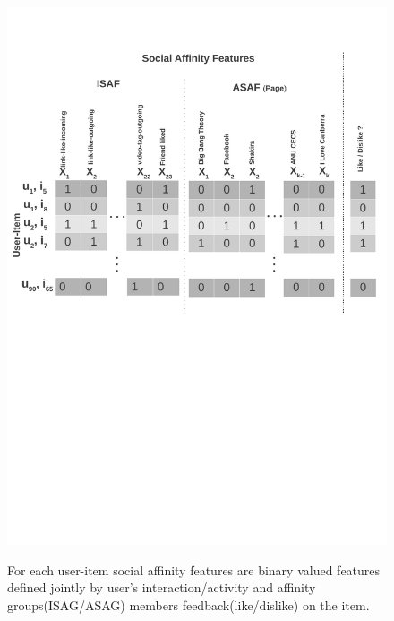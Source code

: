 \begin{figure}[t!]
\centering
\includegraphics[width=1\linewidth]{data/plots/features/saf_features}
\label{fig:Features}
\caption{For each user-item social affinity features are binary valued features defined 
jointly by user's interaction/activity and affinity groups(ISAG/ASAG) members feedback(like/dislike) on the item.}
\end{figure}

